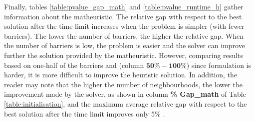 \documentclass[a4paper,  review, authoryear, 1p.]{elsarticle}
\newcommand{\KMPHN}{{\sf{H-KMPHN}}}
\newcommand{\KMPN}{{\sf{H-KMPN}\xspace }}
\newcommand{\JP}[1]{{\color{blue}#1}}
\begin{document}
		
			
		
		\JP{
		Finally, tables \ref{table:pvalue_gap_math} and \ref{table:pvalue_runtime_h} gather information about the matheuristic.  The relative gap with respect to the best solution after the time limit increases when the problem is simpler (with fewer barriers). The lower the number of barriers, the higher the relative gap. When the number of barriers is low, the problem is easier and the solver can improve further the solution provided by the matheuristic. 	However, comparing results based on one-half of the barriers and \KMPHN\xspace  (column $\bm{50\%-100\%}$) since \KMPN \xspace formulation is harder, it is more difficult to improve the heuristic solution. In addition, the reader may note that the higher the number of neighbourhoods, the lower the improvement made by the solver, as shown in column \textbf{\% Gap\_math} of Table \ref{table:initialisation}, and the maximum average relative gap with respect to the best solution after the time limit improves only 5\% . 

}
\end{document}
